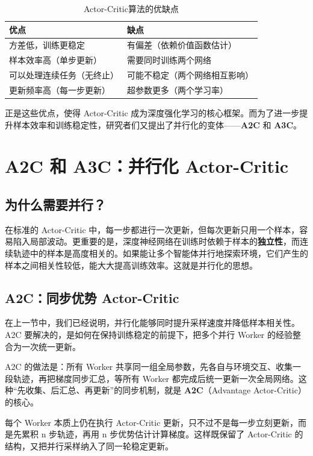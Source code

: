 \documentclass[lang=cn,zihao=-4,a4paper,fontset=windows]{beautybook}
\begin{document}
\begin{table}[H]
\centering
\caption{Actor-Critic算法的优缺点}
\begin{tabular}{p{}p{}}
\toprule
\textbf{优点} & \textbf{缺点} \\
\midrule
方差低，训练更稳定 & 有偏差（依赖价值函数估计） \\
样本效率高（单步更新） & 需要同时训练两个网络 \\
可以处理连续任务（无终止） & 可能不稳定（两个网络相互影响） \\
更新频率高（每一步更新） & 超参数更多（两个学习率） \\
\bottomrule
\end{tabular}
\end{table}

正是这些优点，使得 Actor-Critic 成为深度强化学习的核心框架。而为了进一步提升样本效率和训练稳定性，研究者们又提出了并行化的变体——\textbf{A2C} 和 \textbf{A3C}。

\section{A2C 和 A3C：并行化 Actor-Critic}

\subsection{为什么需要并行？}

在标准的 Actor-Critic 中，每一步都进行一次更新，但每次更新只用一个样本，容易陷入局部波动。更重要的是，深度神经网络在训练时依赖于样本的\textbf{独立性}，而连续轨迹中的样本是高度相关的。如果能让多个智能体并行地探索环境，它们产生的样本之间相关性较低，能大大提高训练效率。这就是并行化的思想。

\subsection{A2C：同步优势 Actor-Critic}

在上一节中，我们已经说明，并行化能够同时提升采样速度并降低样本相关性。A2C 要解决的，是如何在保持训练稳定的前提下，把多个并行 Worker 的经验整合为一次统一更新。

A2C 的做法是：所有 Worker 共享同一组全局参数，先各自与环境交互、收集一段轨迹，再把梯度同步汇总，等所有 Worker 都完成后统一更新一次全局网络。这种“先收集、后汇总、再更新”的同步机制，就是 \textbf{A2C}（Advantage Actor-Critic）的核心。

每个 Worker 本质上仍在执行 Actor-Critic 更新，只不过不是每一步立刻更新，而是先累积 n 步轨迹，再用 n 步优势估计计算梯度。这样既保留了 Actor-Critic 的结构，又把并行采样纳入了同一轮稳定更新。
\end{document}
